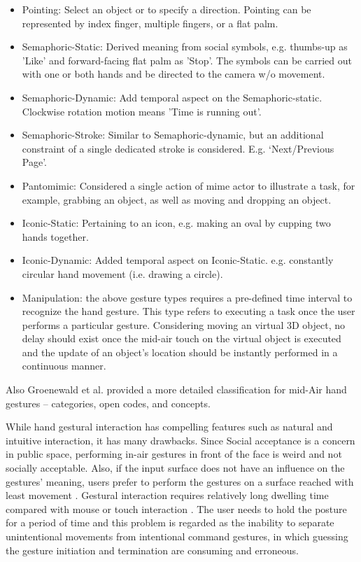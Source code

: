 \documentclass[fyp]{socreport}
\begin{document}
\small
\begin{itemize}
    \item Pointing: Select an object or to specify a direction. Pointing can be represented by index finger, multiple fingers, or a flat palm.
    \item Semaphoric-Static: Derived meaning from social symbols, e.g. thumbs-up as ’Like’ and forward-facing flat palm as ’Stop’. The symbols can be carried out with one or both hands and be directed to the camera w/o movement.
    \item Semaphoric-Dynamic: Add temporal aspect on the Semaphoric-static. Clockwise rotation motion means ’Time is running out’.
    \item Semaphoric-Stroke: Similar to Semaphoric-dynamic, but an additional constraint of a single dedicated stroke is considered. E.g. ‘Next/Previous Page’.
    \item Pantomimic: Considered a single action of mime actor to illustrate a task, for example, grabbing an object, as well as moving and dropping an object.
    \item Iconic-Static: Pertaining to an icon, e.g. making an oval by cupping two hands together.
    \item Iconic-Dynamic: Added temporal aspect on Iconic-Static. e.g. constantly circular hand movement (i.e. drawing a circle).
    \item Manipulation: the above gesture types requires a pre-defined time interval to recognize the hand gesture. This type refers to executing a task once the user performs a particular gesture. Considering moving an virtual 3D object, no delay should exist once the mid-air touch on the virtual object is executed and the update of an object’s location should be instantly performed in a continuous manner.
\end{itemize}
\normalsize

Also Groenewald et al. \cite{groenewald2016understanding} provided a more detailed classification for mid-Air hand gestures -- categories, open codes, and concepts. 

While hand gestural interaction has compelling features such as natural and intuitive interaction, it has many drawbacks. Since Social acceptance is a concern in public space, performing in-air gestures in front of the face is weird and not socially acceptable. Also, if the input surface does not have an influence on the gestures’ meaning, users prefer to perform the gestures on a surface reached with least movement \cite{tung2015user}. Gestural interaction requires relatively long dwelling time compared with mouse or touch interaction \cite{istance2008snap}. The user needs to hold the posture for a period of time and this problem is regarded as the inability to separate unintentional movements from intentional command gestures, in which guessing the gesture initiation and termination are consuming and erroneous. 
\end{document}
